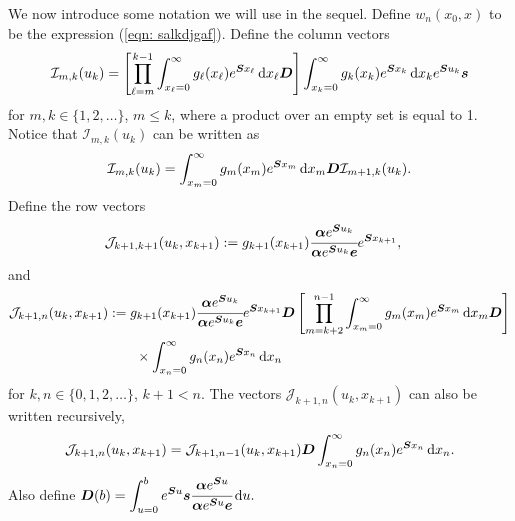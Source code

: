 We now introduce some notation we will use in the sequel. Define \(w_n(x_0,x)\) to be the expression (\ref{eqn: salkdjgaf}). Define the column vectors 
\begin{align}
	\mathcal I_{m,k}(u_k) = \left[\prod_{\ell=m}^{k-1}\int_{x_\ell=0}^\infty g_\ell(x_\ell) e^{\boldsymbol{S}x_\ell}\, \mathrm{d} x_\ell \boldsymbol{D} \right]
            	\int_{x_k=0}^\infty g_{k}(x_k) e^{\boldsymbol{S}x_k} \, \mathrm{d} x_k e^{\boldsymbol{S}u_k}\boldsymbol s
\end{align}
for \(m,k\in\{1,2,\dots\}\), \(m\leq k\), where a product over an empty set is equal to 1. Notice that \(\mathcal I_{m,k}(u_k)\) can be written as 
\begin{align}
	\mathcal I_{m,k}(u_k) = \int_{x_m=0}^\infty g_m(x_m)e^{\boldsymbol Sx_m} \, \mathrm{d} x_m \boldsymbol D \mathcal I_{m+1,k}(u_k). \label{eqn: I recursive} 
\end{align}
Define the row vectors 
\begin{align}
	\mathcal J_{k+1,k+1}(u_k,x_{k+1}) &:= g_{k+1}(x_{k+1})\cfrac{\boldsymbol \alpha e^{\boldsymbol{S}u_{k}}}{\boldsymbol \alpha e^{\boldsymbol{S}u_{k}}\boldsymbol e}e^{\boldsymbol{S}x_{k+1}},
\end{align}
and
\begin{align}
	\mathcal J_{k+1,n}(u_k,x_{k+1}) &:= g_{k+1}(x_{k+1})\cfrac{\boldsymbol \alpha e^{\boldsymbol{S}u_{k}}}{\boldsymbol \alpha e^{\boldsymbol{S}u_{k}}\boldsymbol e} e^{\boldsymbol{S}x_{k+1}} \boldsymbol{D} \left[\prod_{m=k+2}^{n-1}\int_{x_{m}=0}^\infty g_{m}(x_{m}) e^{\boldsymbol{S}x_{m}} \, \mathrm{d} x_{m} \boldsymbol{D} \right]\nonumber
            	\\&\qquad\times\int_{x_n=0}^\infty g_{n}(x_n) e^{\boldsymbol{S}x_n} \, \mathrm{d} x_n
\end{align}
for \(k,n\in\{0,1,2,\dots\}\), \(k+1<n\). The vectors \(\mathcal J_{k+1,n}(u_k,x_{k+1})\) can also be written recursively, 
\begin{align}
	\mathcal J_{k+1,n}(u_k,x_{k+1}) = \mathcal J_{k+1,n-1}(u_k,x_{k+1})\boldsymbol D \int_{x_n=0}^\infty g_n(x_n)e^{\boldsymbol Sx_n}\, \mathrm{d} x_n.\label{eqn: J recursive} 
\end{align}
Also define \(\displaystyle\boldsymbol D(b) = \int_{u=0}^be^{\boldsymbol Su}\boldsymbol s \cfrac{\boldsymbol\alpha e^{\boldsymbol S u}}{\boldsymbol \alpha e^{\boldsymbol S u}\boldsymbol e} \, \mathrm{d} u.\)

